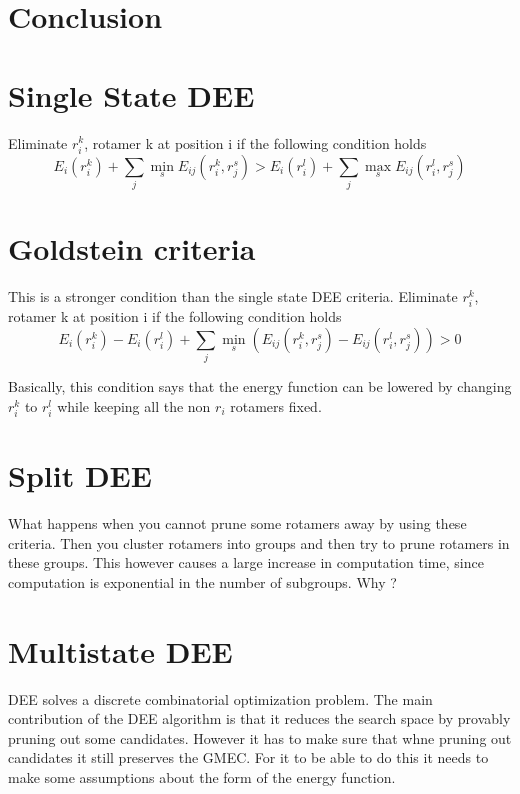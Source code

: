 \documentclass[a4]{article}
\begin{document}
\section{Conclusion}




\pagebreak
\newpage

\appendix

\section{Single State DEE}

Eliminate $r_i^k$, rotamer k at position i if the following condition holds
\[
E_i(r_i^k) + \sum_j \min_s E_{ij}(r_i^k,r_j^s) > E_i(r_i^l) + \sum_j \max_s E_{ij}(r_i^l,r_j^s)
\]


\section{Goldstein criteria}
This is a stronger condition than the single state DEE criteria.
Eliminate $r_i^k$, rotamer k at position i if the following condition holds
\[
E_i(r_i^k) - E_i(r_i^l) + \sum_j \min_s \left(E_{ij}(r_i^k,r_j^s) - E_{ij}(r_i^l,r_j^s) \right)> 0  
\]

Basically, this condition says that the energy function can be lowered by changing $r_i^k$ to $r_i^l$ while keeping all the non $r_i$ rotamers fixed. 


\section{Split DEE}
What happens when you cannot prune some rotamers away by using these criteria. Then you cluster rotamers into groups and then try to prune rotamers in these groups. This however causes a large increase in computation time, since computation is exponential in the number of subgroups. Why ?

\section{Multistate DEE}
DEE solves a discrete combinatorial optimization problem. The main contribution of the DEE algorithm is that it reduces the search space by provably pruning out some candidates. However it has to make sure that whne pruning out candidates it still preserves the GMEC. For it to be able to do this it needs to make some assumptions about the form of the energy function. 
\end{document}
